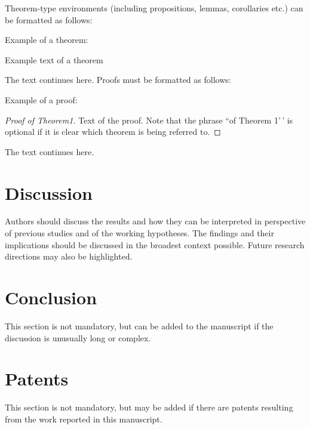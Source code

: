 \documentclass[notspecified,article,submit,moreauthors,pdftex]{Definitions/mdpi}
\begin{document}
Theorem-type environments (including propositions, lemmas, corollaries
etc.) can be formatted as follows:

Example of a theorem:

\begin{Theorem}
Example text of a theorem

\end{Theorem}

The text continues here. Proofs must be formatted as follows:

Example of a proof:

\begin{proof}[Proof of Theorem1]
Text of the proof. Note that the phrase ``of Theorem 1'\,' is optional
if it is clear which theorem is being referred to.

\end{proof}

The text continues here.

\section{Discussion}\label{discussion}

Authors should discuss the results and how they can be interpreted in
perspective of previous studies and of the working hypotheses. The
findings and their implications should be discussed in the broadest
context possible. Future research directions may also be highlighted.

\section{Conclusion}\label{conclusion}

This section is not mandatory, but can be added to the manuscript if the
discussion is unusually long or complex.

\section{Patents}\label{patents}

This section is not mandatory, but may be added if there are patents
resulting from the work reported in this manuscript.


\vspace{6pt}

\end{document}
